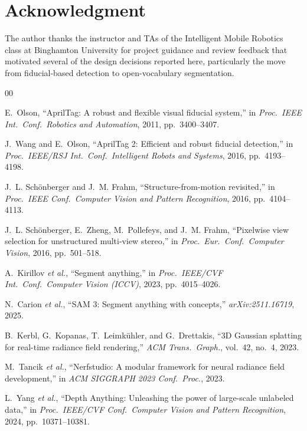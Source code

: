\documentclass[conference]{IEEEtran}
\begin{document}
\section*{Acknowledgment}

The author thanks the instructor and TAs of the
Intelligent Mobile Robotics class at Binghamton University for
project guidance and review feedback that motivated several of
the design decisions reported here, particularly the move from
fiducial-based detection to open-vocabulary segmentation.

\begin{thebibliography}{00}

E.~Olson, ``AprilTag: A robust and flexible visual fiducial
system,'' in \emph{Proc.\ IEEE Int.\ Conf.\ Robotics and
Automation}, 2011, pp.~3400--3407.

J.~Wang and E.~Olson, ``AprilTag 2: Efficient and robust fiducial
detection,'' in \emph{Proc.\ IEEE/RSJ Int.\ Conf.\ Intelligent
Robots and Systems}, 2016, pp.~4193--4198.

J.~L. Sch\"onberger and J.~M. Frahm, ``Structure-from-motion
revisited,'' in \emph{Proc.\ IEEE Conf.\ Computer Vision and
Pattern Recognition}, 2016, pp.~4104--4113.

J.~L. Sch\"onberger, E.~Zheng, M.~Pollefeys, and J.~M. Frahm,
``Pixelwise view selection for unstructured multi-view stereo,''
in \emph{Proc.\ Eur.\ Conf.\ Computer Vision}, 2016, pp.~501--518.

A.~Kirillov \emph{et al.}, ``Segment anything,'' in \emph{Proc.\ IEEE/CVF
Int.\ Conf.\ Computer Vision (ICCV)}, 2023, pp.~4015--4026.

N.~Carion \emph{et al.}, ``SAM 3: Segment anything with concepts,''
\emph{arXiv:2511.16719}, 2025.

B.~Kerbl, G.~Kopanas, T.~Leimk\"uhler, and G.~Drettakis,
``3D Gaussian splatting for real-time radiance field rendering,''
\emph{ACM Trans.\ Graph.}, vol.~42, no.~4, 2023.

M.~Tancik \emph{et al.}, ``Nerfstudio: A modular framework for neural
radiance field development,'' in \emph{ACM SIGGRAPH 2023 Conf.\
Proc.}, 2023.

L.~Yang \emph{et al.}, ``Depth Anything: Unleashing the power of
large-scale unlabeled data,'' in \emph{Proc.\ IEEE/CVF Conf.\
Computer Vision and Pattern Recognition}, 2024, pp.~10371--10381.


\end{thebibliography}
\end{document}
